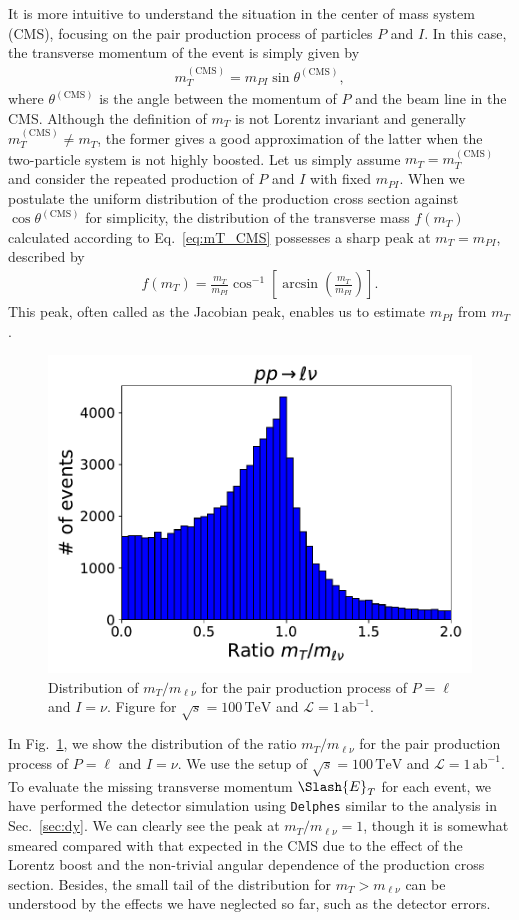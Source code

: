 \documentclass[12pt,twoside,book]{article}
\begin{document}
It is more intuitive to understand the situation in the center of mass system (CMS), focusing on the pair production process of particles $P$ and $I$.
In this case, the transverse momentum of the event is simply given by
\begin{align}
  m_T^{\mathrm{(CMS)}} = m_{PI} \sin \theta^{(\mathrm{CMS})},
  \label{eq:mT_CMS}
\end{align}
where $\theta^{(\mathrm{CMS})}$ is the angle between the momentum of $P$ and the beam line in the CMS.
Although the definition of $m_T$ is not Lorentz invariant and generally $m_T^{\mathrm{(CMS)}} \neq m_T$, the former gives a good approximation of the latter when the two-particle system is not highly boosted.
Let us simply assume $m_T = m_T^{\mathrm{(CMS)}}$ and consider the repeated production of $P$ and $I$ with fixed $m_{PI}$.
When we postulate the uniform distribution of the production cross section against $\cos \theta^{(\mathrm{CMS})}$ for simplicity, the distribution of the transverse mass $f(m_T)$ calculated according to Eq.~\eqref{eq:mT_CMS} possesses a sharp peak at $m_T = m_{PI}$, described by
\begin{align}
  f(m_T) =\frac{m_T}{m_{PI}}
  \cos^{-1} \left[ \arcsin \left( \frac{m_T}{m_{PI}} \right) \right].
\end{align}
This peak, often called as the Jacobian peak, enables us to estimate $m_{PI}$ from $m_T$.

\begin{figure}[t]
  \centering
  \includegraphics[width=0.5\hsize]{invariant_vs_transverse.pdf}
  \caption{
    Distribution of $m_T / m_{\ell \nu}$ for the pair production process of $P=\ell$ and $I=\nu$.
    Figure for $\sqrt{s}=100\,\mathrm{TeV}$ and $\mathcal{L}=1\,\mathrm{ab}^{-1}$.
  }
  \label{fig:invariant_vs_transverse}
\end{figure}

In Fig.~\ref{fig:invariant_vs_transverse}, we show the distribution of the ratio $m_T / m_{\ell \nu}$ for the pair production process of $P=\ell$ and $I=\nu$.
We use the setup of $\sqrt{s}=100\,\mathrm{TeV}$ and $\mathcal{L}=1\,\mathrm{ab}^{-1}$.
To evaluate the missing transverse momentum $\Slash{E}_T$ for each event, we have performed the detector simulation using \texttt{Delphes} similar to the analysis in Sec.~\ref{sec:dy}.
We can clearly see the peak at $m_T / m_{\ell \nu} = 1$, though it is somewhat smeared compared with that expected in the CMS due to the effect of the Lorentz boost and the non-trivial angular dependence of the production cross section.
Besides, the small tail of the distribution for $m_T > m_{\ell \nu}$ can be understood by the effects we have neglected so far, such as the detector errors.
\end{document}
